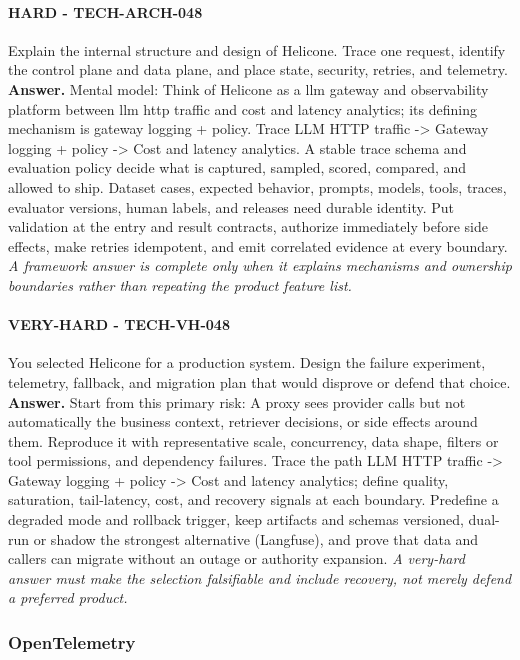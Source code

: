 \paragraph{HARD - TECH-ARCH-048} Explain the internal structure and design of Helicone. Trace one request, identify the control plane and data plane, and place state, security, retries, and telemetry.
\textbf{Answer.} Mental model: Think of Helicone as a llm gateway and observability platform between llm http traffic and cost and latency analytics; its defining mechanism is gateway logging + policy. Trace LLM HTTP traffic -> Gateway logging + policy -> Cost and latency analytics. A stable trace schema and evaluation policy decide what is captured, sampled, scored, compared, and allowed to ship. Dataset cases, expected behavior, prompts, models, tools, traces, evaluator versions, human labels, and releases need durable identity. Put validation at the entry and result contracts, authorize immediately before side effects, make retries idempotent, and emit correlated evidence at every boundary.
\textit{A framework answer is complete only when it explains mechanisms and ownership boundaries rather than repeating the product feature list.}
\paragraph{VERY-HARD - TECH-VH-048} You selected Helicone for a production system. Design the failure experiment, telemetry, fallback, and migration plan that would disprove or defend that choice.
\textbf{Answer.} Start from this primary risk: A proxy sees provider calls but not automatically the business context, retriever decisions, or side effects around them. Reproduce it with representative scale, concurrency, data shape, filters or tool permissions, and dependency failures. Trace the path LLM HTTP traffic -> Gateway logging + policy -> Cost and latency analytics; define quality, saturation, tail-latency, cost, and recovery signals at each boundary. Predefine a degraded mode and rollback trigger, keep artifacts and schemas versioned, dual-run or shadow the strongest alternative (Langfuse), and prove that data and callers can migrate without an outage or authority expansion.
\textit{A very-hard answer must make the selection falsifiable and include recovery, not merely defend a preferred product.}
\subsubsection*{OpenTelemetry}
